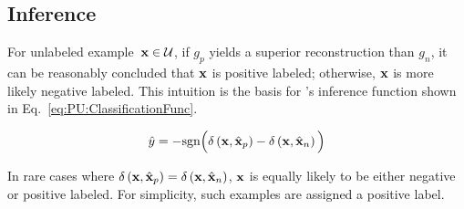 %   

\subsection{Inference}

For unlabeled example~${\mathbf{x}\in\mathcal{U}}$, if $g_{p}$ yields a superior reconstruction than $g_{n}$, it can be reasonably concluded that $\mathbf{x}$ is positive labeled; otherwise, $\mathbf{x}$ is more likely negative labeled.  This intuition is the basis for \toolname's inference function shown in Eq.~\eqref{eq:PU:ClassificationFunc}.

  \begin{equation}\label{eq:PU:ClassificationFunc}
    \hat{y} = -\text{sgn}\Big(\delta\left(\mathbf{x}, \hat{\mathbf{x}}_{p}\right) - \delta\left(\mathbf{x}, \hat{\mathbf{x}}_{n}\right)\Big)
  \end{equation}

\noindent
In rare cases where ${\delta\left(\mathbf{x}, \hat{\mathbf{x}}_{p}\right)=\delta\left(\mathbf{x}, \hat{\mathbf{x}}_{n}\right)}$, $\mathbf{x}$ is equally likely to be either negative or positive labeled.  For simplicity, such examples are assigned a positive label.


